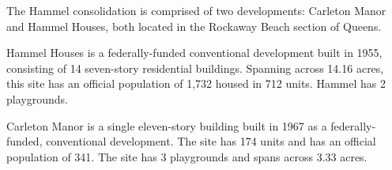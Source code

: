 The Hammel consolidation is comprised of two developments: Carleton Manor and Hammel Houses, both located in the Rockaway Beach section of Queens. \par \vspace{.7\baselineskip}Hammel Houses is a federally-funded conventional development built in 1955, consisting of 14 seven-story residential buildings. Spanning across 14.16 acres, this site has an official population of 1,732 housed in 712 units. Hammel has 2 playgrounds. \par \vspace{.7\baselineskip}Carleton Manor is a single eleven-story building built in 1967 as a federally-funded, conventional development. The site has 174 units and has an official population of 341. The site has 3 playgrounds and spans across 3.33 acres.